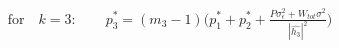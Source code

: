 \documentclass[preview]{standalone}
\begin{document}
\begin{align*}
\text{for} \quad k=3: \qquad p_3^\ast = \left(m_3 - 1\right) \bigg( p_1^\ast + p_2^\ast + \frac{P \sigma_\epsilon^2 + W_{tot} \sigma^2}{\left|\hat{h_3}\right|^2} \bigg)
\end{align*}
\end{document}
